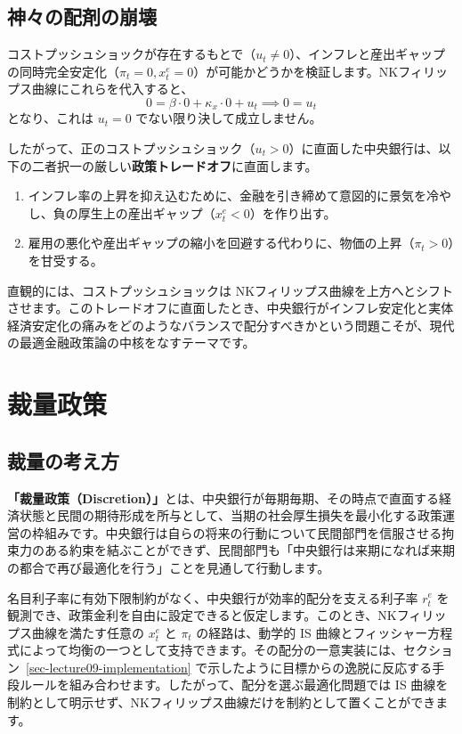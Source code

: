 \documentclass[
  japanese,
  lualatex,
  ja=standard,
  12pt,
  a4paper]{ltjsarticle}
\providecommand{\tightlist}{%
  \setlength{\itemsep}{0pt}\setlength{\parskip}{0pt}}
\begin{document}
\subsection{神々の配剤の崩壊}\label{ux795eux3005ux306eux914dux5264ux306eux5d29ux58ca}

コストプッシュショックが存在するもとで（\(u_t \neq 0\)）、インフレと産出ギャップの同時完全安定化（\(\pi_t=0, x_t^e=0\)）が可能かどうかを検証します。NKフィリップス曲線にこれらを代入すると、
\[
0=\beta\cdot 0+\kappa_x\cdot 0+u_t \implies 0 = u_t
\] となり、これは \(u_t=0\) でない限り決して成立しません。

したがって、正のコストプッシュショック（\(u_t>0\)）に直面した中央銀行は、以下の二者択一の厳しい\textbf{政策トレードオフ}に直面します。

\begin{enumerate}
\def\labelenumi{\arabic{enumi}.}
\tightlist
\item
  インフレ率の上昇を抑え込むために、金融を引き締めて意図的に景気を冷やし、負の厚生上の産出ギャップ（\(x_t^e<0\)）を作り出す。
\item
  雇用の悪化や産出ギャップの縮小を回避する代わりに、物価の上昇（\(\pi_t>0\)）を甘受する。
\end{enumerate}

直観的には、コストプッシュショックは
NKフィリップス曲線を上方へとシフトさせます。このトレードオフに直面したとき、中央銀行がインフレ安定化と実体経済安定化の痛みをどのようなバランスで配分すべきかという問題こそが、現代の最適金融政策論の中核をなすテーマです。

\Needspace{0.35\textheight}

\section{裁量政策}\label{ux88c1ux91cfux653fux7b56}

\subsection{裁量の考え方}\label{ux88c1ux91cfux306eux8003ux3048ux65b9}

\textbf{「裁量政策（Discretion）」}とは、中央銀行が毎期毎期、その時点で直面する経済状態と民間の期待形成を所与として、当期の社会厚生損失を最小化する政策運営の枠組みです。中央銀行は自らの将来の行動について民間部門を信服させる拘束力のある約束を結ぶことができず、民間部門も「中央銀行は来期になれば来期の都合で再び最適化を行う」ことを見通して行動します。

名目利子率に有効下限制約がなく、中央銀行が効率的配分を支える利子率
\(r_t^e\)
を観測でき、政策金利を自由に設定できると仮定します。このとき、NKフィリップス曲線を満たす任意の
\(x_t^e\) と \(\pi_t\) の経路は、動学的 IS
曲線とフィッシャー方程式によって均衡の一つとして支持できます。その配分の一意実装には、セクション~\ref{sec-lecture09-implementation}
で示したように目標からの逸脱に反応する手段ルールを組み合わせます。したがって、配分を選ぶ最適化問題では
IS
曲線を制約として明示せず、NKフィリップス曲線だけを制約として置くことができます。
\end{document}
